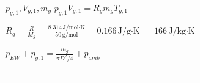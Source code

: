 \( p_{g,1}, V_{g,1}, m_g \)  
\( p_{g,1} V_{g,1} = R_g m_g T_{g,1} \)  

\( R_g = \frac{R}{M_g} = \frac{8.314 \, \text{J/mol·K}}{50 \, \text{g/mol}} = 0.166 \, \text{J/g·K} \)  
\( = 166 \, \text{J/kg·K} \)  

\( p_{EW} + p_{g,1} = \frac{m_g}{\pi D^2 / 4} + p_{amb} \)  

---